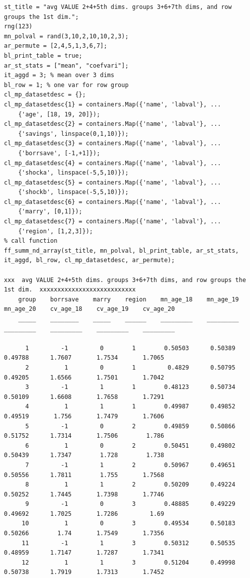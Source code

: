 \documentclass[
]{book}
\begin{document}
\begin{verbatim}
st_title = "avg VALUE 2+4+5th dims. groups 3+6+7th dims, and row groups the 1st dim.";
rng(123)
mn_polval = rand(3,10,2,10,10,2,3);
ar_permute = [2,4,5,1,3,6,7];
bl_print_table = true;
ar_st_stats = ["mean", "coefvari"];
it_aggd = 3; % mean over 3 dims
bl_row = 1; % one var for row group
cl_mp_datasetdesc = {};
cl_mp_datasetdesc{1} = containers.Map({'name', 'labval'}, ...
    {'age', [18, 19, 20]});
cl_mp_datasetdesc{2} = containers.Map({'name', 'labval'}, ...
    {'savings', linspace(0,1,10)});
cl_mp_datasetdesc{3} = containers.Map({'name', 'labval'}, ...
    {'borrsave', [-1,+1]});
cl_mp_datasetdesc{4} = containers.Map({'name', 'labval'}, ...
    {'shocka', linspace(-5,5,10)});
cl_mp_datasetdesc{5} = containers.Map({'name', 'labval'}, ...
    {'shockb', linspace(-5,5,10)});
cl_mp_datasetdesc{6} = containers.Map({'name', 'labval'}, ...
    {'marry', [0,1]});
cl_mp_datasetdesc{7} = containers.Map({'name', 'labval'}, ...
    {'region', [1,2,3]});
% call function
ff_summ_nd_array(st_title, mn_polval, bl_print_table, ar_st_stats, it_aggd, bl_row, cl_mp_datasetdesc, ar_permute);

xxx  avg VALUE 2+4+5th dims. groups 3+6+7th dims, and row groups the 1st dim.  xxxxxxxxxxxxxxxxxxxxxxxxxxx
    group    borrsave    marry    region    mn_age_18    mn_age_19    mn_age_20    cv_age_18    cv_age_19    cv_age_20
    _____    ________    _____    ______    _________    _________    _________    _________    _________    _________

      1         -1         0        1        0.50503      0.50389      0.49788      1.7607       1.7534       1.7065  
      2          1         0        1         0.4829      0.50795      0.49205      1.6566       1.7501       1.7042  
      3         -1         1        1        0.48123      0.50734      0.50109      1.6608       1.7658       1.7291  
      4          1         1        1        0.49987      0.49852      0.49519       1.756       1.7479       1.7606  
      5         -1         0        2        0.49859      0.50866      0.51752      1.7314       1.7506        1.786  
      6          1         0        2        0.50451      0.49802      0.50439      1.7347        1.728        1.738  
      7         -1         1        2        0.50967      0.49651      0.50556      1.7811        1.755       1.7568  
      8          1         1        2        0.50209      0.49224      0.50252      1.7445       1.7398       1.7746  
      9         -1         0        3        0.48885      0.49229      0.49692      1.7025       1.7286         1.69  
     10          1         0        3        0.49534      0.50183      0.50266        1.74       1.7549       1.7356  
     11         -1         1        3        0.50312      0.50535      0.48959      1.7147       1.7287       1.7341  
     12          1         1        3        0.51204      0.49998      0.50738      1.7919       1.7313       1.7452  
\end{verbatim}
\end{document}
